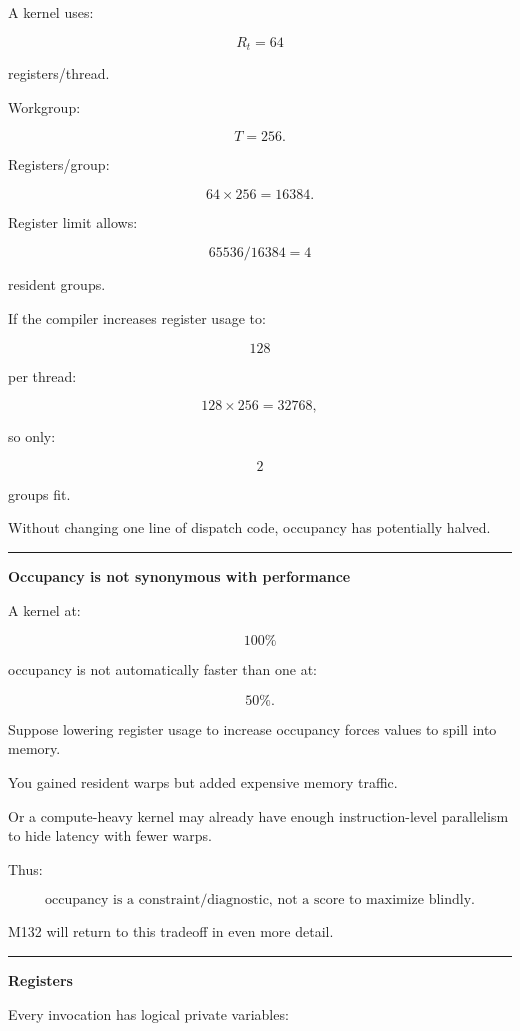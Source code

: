 A kernel uses:

\[
R_t=64
\]

registers/thread.

Workgroup:

\[
T=256.
\]

Registers/group:

\[
64\times256=16384.
\]

Register limit allows:

\[
65536/16384=4
\]

resident groups.

If the compiler increases register usage to:

\[
128
\]

per thread:

\[
128\times256=32768,
\]

so only:

\[
2
\]

groups fit.

Without changing one line of dispatch code, occupancy has potentially halved.

\begin{center}\rule{0.5\linewidth}{0.5pt}\end{center}

\textbf{Occupancy is not synonymous with performance}

A kernel at:

\[
100\%
\]

occupancy is not automatically faster than one at:

\[
50\%.
\]

Suppose lowering register usage to increase occupancy forces values to spill into memory.

You gained resident warps but added expensive memory traffic.

Or a compute-heavy kernel may already have enough instruction-level parallelism to hide latency with fewer warps.

Thus:

\[
\boxed{
\text{occupancy is a constraint/diagnostic, not a score to maximize blindly}.
}
\]

M132 will return to this tradeoff in even more detail.

\begin{center}\rule{0.5\linewidth}{0.5pt}\end{center}

\textbf{Registers}

Every invocation has logical private variables:

